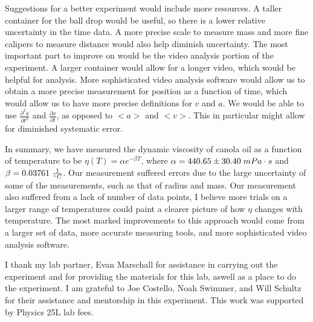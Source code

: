 \documentclass[aps,twocolumn,showpacs,preprintnumbers]{revtex4}
\begin{document}

Suggestions for a better experiment would include more resources. A taller container for the ball drop would be useful, so there is a lower relative uncertainty in the time data. A more precise scale to measure mass and more fine calipers to measure distance would also help diminish uncertainty.
The most important part to improve on would be the video analysis portion of the experiment. A larger container would allow for a longer video, which would be helpful for analysis. More sophisticated video analysis software would allow us to obtain a more precise measurement for position as a function of time, which would allow us to have more precise definitions for $v$ and $a$. We would be able to use $\frac{\partial^2 x}{\partial t^2}$ and $\frac{\partial x}{\partial t}$, as opposed to $<a>$ and $<v>$. 
This in particular might allow for diminished systematic error. 






In summary, we have measured the dynamic viscosity of canola oil as a function of temperature to be $\eta (T) = \alpha e^{-\beta T}$, where $\alpha = 440.65 \pm 30.40 \hspace{0.1cm} mPa\cdot s$ and $\beta = 0.03761 \hspace{0.1cm} \frac{1}{^{\circ}C}$.
Our measurement suffered errors due to the large uncertainty of some of the measurements, such as that of radius and mass. Our measurement also suffered from a lack of number of data points, I believe more trials on a larger range of temperatures could paint a clearer picture of how $\eta$ changes with temperature.
The most marked improvements to this approach would come from a larger set of data, more accurate measuring tools, and more sophisticated video analysis software.


I thank my lab partner, Evan Marschall for assistance in carrying out the experiment and for providing the materials for this lab, aswell as a place to do the experiment.  I am grateful to Joe Costello, Noah Swimmer, and Will Schultz for their assistance and mentorship in this experiment.  
This work was supported by Physics 25L lab fees.
\end{document}
